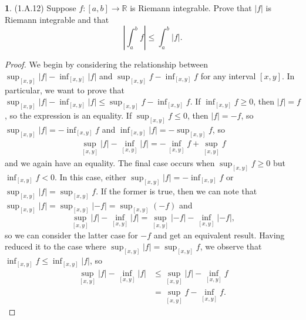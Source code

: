 \documentclass[12pt]{article}
\theoremstyle{definition}
\newtheorem{ex}{}
\begin{document}
\begin{ex}
	(1.A.12)
	Suppose $f: [a, b] \to \mathbb{R}$ is Riemann integrable.
	Prove that $|f|$ is Riemann integrable and that \begin{equation*}
		\left| \int_a^b f \right| \leq \int_a^b |f|.
	\end{equation*}
\end{ex}
\begin{proof}
	We begin by considering the relationship between $\sup_{[x, y]}|f| - \inf_{[x, y]} |f|$ and $\sup_{[x,y]}f - \inf_{[x,y]} f$ for any interval $[x,y]$.
	In particular, we want to prove that $\sup_{[x,y]}|f| - \inf_{[x,y]}|f| \leq \sup_{[x,y]}f - \inf_{[x,y]}f$.
	If $\inf_{[x,y]}f \geq 0$, then $|f| = f$, so the expression is an equality.
	If $\sup_{[x,y]}f \leq 0$, then $|f| = -f$, so $\sup_{[x,y]}|f| = -\inf_{[x,y]}f$ and $\inf_{[x,y]}|f| = -\sup_{[x,y]}f$, so \begin{align*}
		\sup_{[x,y]}|f| - \inf_{[x,y]}|f| = -\inf_{[x,y]}f + \sup_{[x,y]}f
	\end{align*}
	and we again have an equality.
	The final case occurs when $\sup_{[x,y]}f \geq 0$ but $\inf_{[x,y]}f < 0$.
	In this case, either $\sup_{[x,y]}|f| = -\inf_{[x,y]}f$ or $\sup_{[x,y]}|f| = \sup_{[x,y]}f$.
	If the former is true, then we can note that $\sup_{[x,y]}|f| = \sup_{[x,y]}|-f| = \sup_{[x,y]}(-f)$ and \begin{equation*}
		\sup_{[x,y]}|f| - \inf_{[x,y]}|f| = \sup_{[x,y]}|-f| - \inf_{[x,y]}|-f|,
	\end{equation*}
	so we can consider the latter case for $-f$ and get an equivalent result.
	Having reduced it to the case where $\sup_{[x,y]}|f| = \sup_{[x,y]}f$, we observe that $\inf_{[x,y]}f \leq \inf_{[x,y]}|f|$, so \begin{align*}
		\sup_{[x,y]}|f|-\inf_{[x,y]}|f| & \leq \sup_{[x,y]}|f|-\inf_{[x,y]}f \\
		                                & = \sup_{[x,y]}f-\inf_{[x,y]}f.
	\end{align*}


\end{proof}
\end{document}
